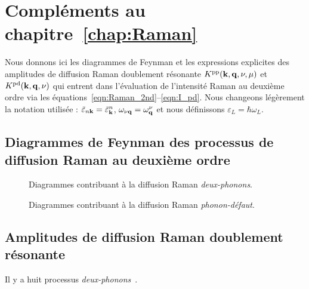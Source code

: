 \chapter{Compléments au chapitre~\ref{chap:Raman}}\label{annexe:Raman}


Nous donnons ici les diagrammes de Feynman et les expressions explicites des amplitudes de diffusion Raman doublement résonante $K^{\text{pp}}(\mathbf{k},\mathbf{q},\nu,\mu)$ et $K^{\text{pd}}(\mathbf{k},\mathbf{q},\nu)$ qui entrent dans l'évaluation de l'intensité Raman au deuxième ordre via les équations~\eqref{eqn:Raman_2nd}--\eqref{eqn:I_pd}. Nous changeons légèrement la notation utilisée : $\tilde{\varepsilon}_{n\mathbf{k}}=\tilde{\varepsilon}_{\mathbf{k}}^n$, $\omega_{\nu\mathbf{q}}=\omega_{\mathbf{q}}^\nu$ et nous définissons $\varepsilon_L=\hbar\omega_L$.

\clearpage
\section{Diagrammes de Feynman des processus de diffusion Raman au deuxième ordre}\label{asec:diagramme}
\begin{figure}[htbp]
    \centering
    
    \caption[Diagrammes contribuant à la diffusion Raman \textit{deux-phonons}.]{Diagrammes contribuant à la diffusion Raman \textit{deux-phonons}.}
    \label{fig:pp}
\end{figure}
\vspace*{\fill}
\clearpage
\vspace*{\fill}
\begin{figure}[htbp]
    \centering
    
    \caption[Diagrammes contribuant à la diffusion Raman \textit{phonon-défaut}.]{Diagrammes contribuant à la diffusion Raman \textit{phonon-défaut}.}
    \label{fig:pd}
\end{figure}
\vspace*{\fill}


\clearpage
\section{Amplitudes de diffusion Raman doublement résonante}\label{asec:amplitude}
Il y a huit processus \textit{deux-phonons}~\cite{venezuelaTheoryDoubleresonantRaman2011}.

